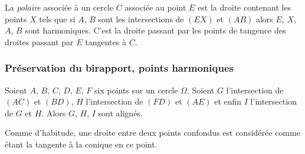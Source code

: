 \begin{dfn}
La \textit{polaire} associée à un cercle $C$ associée au point $E$ est la droite contenant les points $X$ tels que si $A$, $B$ sont les intersections de $(EX)$ et $(AB)$ alors $E$, $X$, $A$, $B$ sont harmoniques. C'est la droite passant par les points de tangence des droites passant par $E$ tangentes à $C$.
\end{dfn}


\subsubsection{Préservation du birapport, points harmoniques}


\begin{thm}
Soient $A$, $B$, $C$, $D$, $E$, $F$ six points sur un cercle $\Omega$. Soient $G$ l'intersection de $(AC)$ et $(BD)$, $H$ l'intersection de $(FD)$ et $(AE)$ et enfin $I$ l'intersection de $G$ et $H$. Alors $G$, $H$, $I$ sont alignés.
\end{thm}


\begin{rem}
Comme d'habitude, une droite entre deux points confondus est considérée comme étant la tangente à la conique en ce point.
\end{rem}


